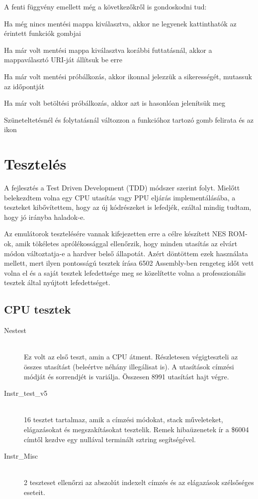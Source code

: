 A fenti függvény emellett még a következőkről is gondoskodni tud:
\begin{compactitem}
	\item Ha még nincs mentési mappa kiválasztva, akkor ne legyenek kattinthatók az érintett funkciók gombjai
	\item Ha már volt mentési mappa kiválasztva korábbi futtatásnál, akkor a mappaválasztó URI-ját állítsuk be erre
	\item Ha már volt mentési próbálkozás, akkor ikonnal jelezzük a sikerességét, mutassuk az időpontját
	\item Ha már volt betöltési próbálkozás, akkor azt is hasonlóan jelenítsük meg
	\item Szüneteltetésnél és folytatásnál változzon a funkcióhoz tartozó gomb felirata és az ikon
\end{compactitem}

\section{Tesztelés}

A fejlesztés a Test Driven Development (TDD) módszer szerint folyt. Mielőtt belekezdtem volna egy CPU utasítás vagy PPU eljárás implementálásába, a teszteket kibővítettem, hogy az új kódrészeket is lefedjék, ezáltal mindig tudtam, hogy jó irányba haladok-e.

Az emulátorok tesztelésére vannak kifejezetten erre a célre készített NES ROM-ok, amik tökéletes aprólékossággal ellenőrzik, hogy minden utasítás az elvárt módon változtatja-e a hardver belső állapotát. Azért döntöttem ezek használata mellett, mert ilyen pontosságú tesztek írása 6502 Assembly-ben rengeteg időt vett volna el és a saját tesztek lefedettsége meg se közelítette volna a professzionális tesztek által nyújtott lefedettséget. 

\subsection{CPU tesztek}

\begin{description}
\item[Nestest] \hfill \\
Ez volt az első teszt, amin a CPU átment. Részletesen végigteszteli az összes utasítást (beleértve néhány illegálisat is). A utasítások címzési módját és sorrendjét is variálja. Összesen 8991 utasítást hajt végre.

\item[Instr\_test\_v5] \hfill \\
16 tesztet tartalmaz, amik a címzési módokat, stack műveleteket, elágazásokat és megszakításokat tesztelik. Remek hibaüzenetek ír a \$6004 címtől kezdve egy nullával terminált sztring segítségével.

\item[Instr\_Misc] \hfill \\
2 teszteset ellenőrzi az abszolút indexelt címzés és az elágazások szélsőséges eseteit.

\end{description}

